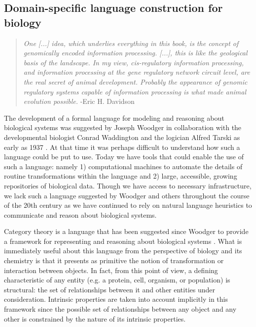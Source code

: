 \documentclass[aps,twocolumn]{revtex4-1}
\begin{document}
\subsection{Domain-specific language construction for biology}

\begin{quotation}
{\it One [...] idea, which underlies everything in this book, is the concept
of genomically encoded information processing. [...],
this is like the geological basis of the landscape. In my view, cis-regulatory information processing, and information processing at the gene regulatory network circuit level, are the real secret of animal development. Probably the appearance of genomic regulatory systems capable of information processing is what made animal evolution possible.} -Eric H. Davidson \cite{Davidson2006a}
\end{quotation}

The development of a formal language for modeling and reasoning about biological systems was suggested by Joseph Woodger in collaboration with the developmental biologist Conrad Waddington and the logician Alfred Tarski as early as 1937 \cite{Woodger1937,Woodger1951,Woodger1952,Woodger1952a}. At that time it was perhaps difficult to understand how such a language could be put to use. Today we have tools that could enable the use of such a language: namely 1) computational machines to automate the details of routine transformations within the language and 2) large, accessible, growing repositories of biological data. Though we have access to necessary infrastructure, we lack such a language suggested by Woodger and others throughout the course of the 20th century as we have continued to rely on natural language heuristics to communicate and reason about biological systems.

Category theory \cite{Lane1985,Lane1998,MacLane1992,Lawvere1997,Lawvere2003,Awodey2006} is a language that has been suggested since Woodger to provide a framework for representing and reasoning about biological systems \cite{GOGUEN1979,Ehresmann2007,Louie2009}. What is immediately useful about this language from the perspective of biology and its chemistry is that it presents as primitive the notion of transformation or interaction between objects. In fact, from this point of view, a defining characteristic of any entity (e.g. a protein, cell, organism, or population) is structural: the set of relationships between it and other entities under consideration. Intrinsic properties are taken into account implicitly in this framework since the possible set of relationships between any object and any other is constrained by the nature of its intrinsic properties. 
\end{document}
